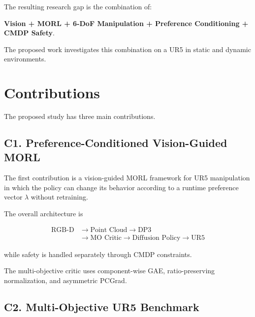 \documentclass[journal]{IEEEtran}
\begin{document}
The resulting research gap is the combination of:

\begin{center}
\textbf{Vision + MORL + 6-DoF Manipulation +
Preference Conditioning + CMDP Safety}.
\end{center}

The proposed work investigates this combination on a UR5 in static and
dynamic environments.


\section{Contributions}

The proposed study has three main contributions.


\subsection*{C1. Preference-Conditioned Vision-Guided MORL}

The first contribution is a vision-guided MORL framework for UR5
manipulation in which the policy can change its behavior according to a
runtime preference vector $\lambda$ without retraining.

The overall architecture is

\begin{equation}
\boxed{
\begin{aligned}
\text{RGB-D}
&\rightarrow
\text{Point Cloud}
\rightarrow
\text{DP3}\\
&\rightarrow
\text{MO Critic}
\rightarrow
\text{Diffusion Policy}
\rightarrow
\text{UR5}
\end{aligned}
}
\end{equation}

while safety is handled separately through CMDP constraints.

The multi-objective critic uses component-wise GAE,
ratio-preserving normalization, and asymmetric PCGrad.


\subsection*{C2. Multi-Objective UR5 Benchmark}
\end{document}
